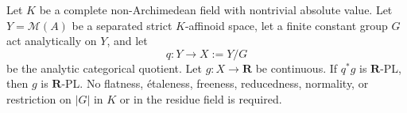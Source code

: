 \begin{proposition}\label{prop:p061-finite-group-rpl-descent-candidate}
Let $K$ be a complete non-Archimedean field with nontrivial absolute value.
Let $Y=\mathcal M(A)$ be a separated strict $K$-affinoid space, let a finite
constant group $G$ act analytically on $Y$, and let
\[
                         q:Y\longrightarrow X:=Y/G
\]
be the analytic categorical quotient.  Let $g:X\to\mathbf R$ be continuous.
If $q^*g$ is $\mathbf R$-PL, then $g$ is $\mathbf R$-PL.
No flatness, \'etaleness, freeness, reducedness, normality, or restriction on
$|G|$ in $K$ or in the residue field is required.
\end{proposition}
